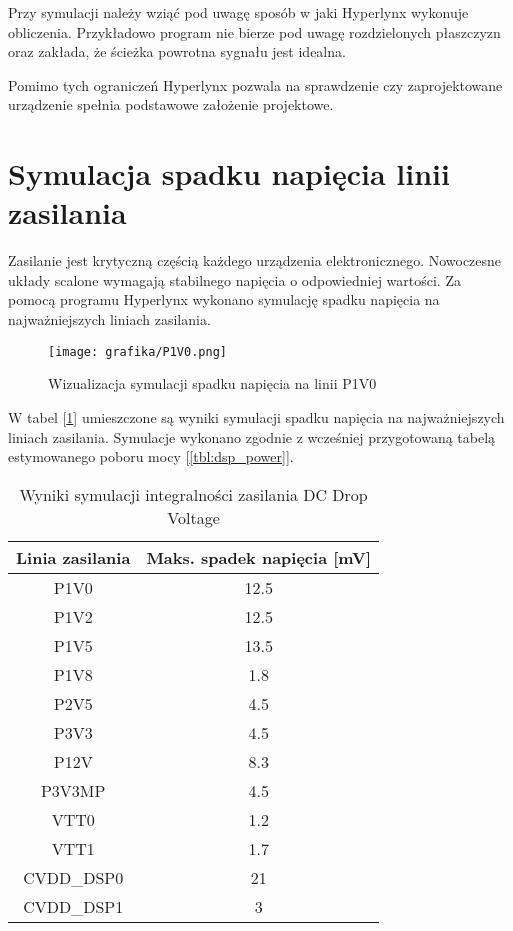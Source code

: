 Przy symulacji należy wziąć pod uwagę sposób w jaki Hyperlynx wykonuje obliczenia. Przykładowo program nie bierze pod uwagę rozdzielonych płaszczyzn oraz zakłada, że ścieżka powrotna sygnału jest idealna. 

Pomimo tych ograniczeń Hyperlynx pozwala na sprawdzenie czy zaprojektowane urządzenie spełnia podstawowe założenie projektowe. 


\section{Symulacja spadku napięcia linii zasilania }
Zasilanie jest krytyczną częścią każdego urządzenia elektronicznego. Nowoczesne układy scalone wymagają stabilnego napięcia o odpowiedniej wartości. Za pomocą programu Hyperlynx wykonano symulację spadku napięcia na najważniejszych liniach zasilania.

\begin{figure}[here]
\begin{center}
\texttt{[image: grafika/P1V0.png]}
\end{center}
\caption{Wizualizacja symulacji spadku napięcia na linii P1V0}
\end{figure}

W tabel [\ref{tbl:pwr_hlx}] umieszczone są wyniki symulacji spadku napięcia na najważniejszych liniach zasilania. Symulacje wykonano zgodnie z wcześniej przygotowaną tabelą estymowanego poboru mocy [\ref{tbl:dsp_power}].

\begin{table}[htb]

\centering
	\caption{Wyniki symulacji integralności zasilania DC Drop Voltage}
    \begin{tabular}{c | c}
	\toprule
    \textbf{Linia zasilania} & \textbf{Maks. spadek napięcia [mV]}\\
    \midrule
   	P1V0 	& 	12.5\\
      	P1V2 	& 	12.5\\
  	P1V5 	& 	13.5\\
      	P1V8 	& 	1.8\\
        	 P2V5 	& 	4.5\\
	 P3V3 	& 	4.5\\
    	 P12V 	& 	8.3\\
	P3V3MP 	& 	4.5\\
	VTT0 	& 	1.2\\
  	VTT1 	& 	1.7\\
 	CVDD\_DSP0 	& 	21\\
	CVDD\_DSP1 	& 	3\\
    \end{tabular}

	\label{tbl:pwr_hlx}
\end{table}



